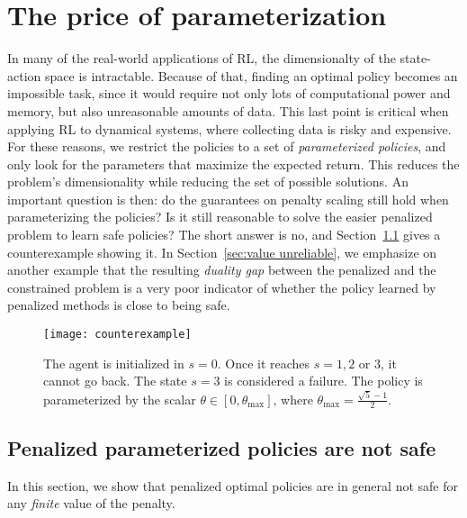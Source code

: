 \section{The price of parameterization} \label{sec:parameterization}
In many of the real-world applications of RL, the dimensionalty of the state-action space is intractable. Because of that, finding an optimal policy becomes an impossible task, since it would require not only lots of computational power and memory, but also unreasonable amounts of data. This last point is critical when applying RL to dynamical systems, where collecting data is risky and expensive. For these reasons, we restrict the policies to a set of\emph{ parameterized policies}, and only look for the parameters that maximize the expected return. This reduces the problem's dimensionality while reducing the set of possible solutions. An important question is then: do the guarantees on penalty scaling still hold when parameterizing the policies? Is it still reasonable to solve the easier penalized problem to learn safe policies? The short answer is no, and Section~\ref{sec:unsafe parameterized} gives a counterexample showing it. In Section~\ref{sec:value unreliable}, we emphasize on another example that the resulting\emph{ duality gap} between the penalized and the constrained problem is a very poor indicator of whether the policy learned by penalized methods is close to being safe.

\begin{figure}
	\centering
		\centering
		\texttt{[image: counterexample]}
		\caption{ The agent is initialized in $s=0$. Once it reaches $s=1, 2$ or $3$, it cannot go back. The state $s=3$ is considered a failure. The policy is parameterized by the scalar $\theta\in[0, \theta_{\text{max}}]$, where $\theta_\text{max} = \frac{\sqrt{5}-1}{2}$.}
		\label{fig:counterexample 1}
	\end{figure}

\subsection{Penalized parameterized policies are not safe} \label{sec:unsafe parameterized}
In this section, we show that penalized optimal policies are in general not safe for any\emph{ finite} value of the penalty.

